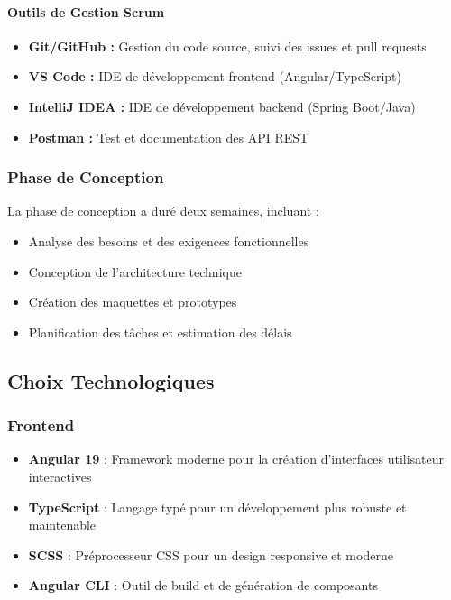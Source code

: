 \documentclass[12pt,a4paper]{article}
\begin{document}
\paragraph{Outils de Gestion Scrum}
\begin{itemize}
    \item \textbf{Git/GitHub :} Gestion du code source, suivi des issues et pull requests
    \item \textbf{VS Code :} IDE de développement frontend (Angular/TypeScript)
    \item \textbf{IntelliJ IDEA :} IDE de développement backend (Spring Boot/Java)
    \item \textbf{Postman :} Test et documentation des API REST
\end{itemize}

\subsubsection{Phase de Conception}
La phase de conception a duré deux semaines, incluant :
\begin{itemize}
    \item Analyse des besoins et des exigences fonctionnelles
    \item Conception de l'architecture technique
    \item Création des maquettes et prototypes
    \item Planification des tâches et estimation des délais
\end{itemize}

\subsection{Choix Technologiques}

\subsubsection{Frontend}
\begin{itemize}
    \item \textbf{Angular 19} : Framework moderne pour la création d'interfaces utilisateur interactives
    \item \textbf{TypeScript} : Langage typé pour un développement plus robuste et maintenable
    \item \textbf{SCSS} : Préprocesseur CSS pour un design responsive et moderne
    \item \textbf{Angular CLI} : Outil de build et de génération de composants
\end{itemize}
\end{document}
